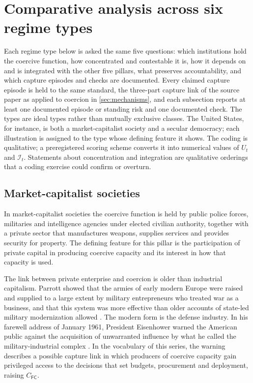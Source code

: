 \documentclass[11pt,letterpaper]{article}
\theoremstyle{definition}
\theoremstyle{remark}
\newcommand{\pF}{\mathsf{F}}
\newcommand{\pC}{\mathsf{C}}
\newcommand{\Integ}{\mathcal{I}}
\begin{document}
\section{Comparative analysis across six regime types}
\label{sec:comparative}

Each regime type below is asked the same five questions: which institutions hold the coercive function, how concentrated and contestable it is, how it depends on and is integrated with the other five pillars, what preserves accountability, and which capture episodes and checks are documented. Every claimed capture episode is held to the same standard, the three-part capture link of the source paper as applied to coercion in \cref{sec:mechanisms}, and each subsection reports at least one documented episode or standing risk and one documented check. The types are ideal types rather than mutually exclusive classes. The United States, for instance, is both a market-capitalist society and a secular democracy; each illustration is assigned to the type whose defining feature it shows. The coding is qualitative; a preregistered scoring scheme converts it into numerical values of $U_t$ and $\Integ_t$. Statements about concentration and integration are qualitative orderings that a coding exercise could confirm or overturn.

\subsection{Market-capitalist societies}
\label{sec:market}

In market-capitalist societies the coercive function is held by public police forces, militaries and intelligence agencies under elected civilian authority, together with a private sector that manufactures weapons, supplies services and provides security for property. The defining feature for this pillar is the participation of private capital in producing coercive capacity and its interest in how that capacity is used.

The link between private enterprise and coercion is older than industrial capitalism. Parrott showed that the armies of early modern Europe were raised and supplied to a large extent by military entrepreneurs who treated war as a business, and that this system was more effective than older accounts of state-led military modernization allowed \citep{parrott2012}. The modern form is the defense industry. In his farewell address of January 1961, President Eisenhower warned the American public against the acquisition of unwarranted influence by what he called the military-industrial complex \citep{eisenhower1961}. In the vocabulary of this series, the warning describes a possible capture link in which producers of coercive capacity gain privileged access to the decisions that set budgets, procurement and deployment, raising $C_{\pF\pC}$.
\end{document}
